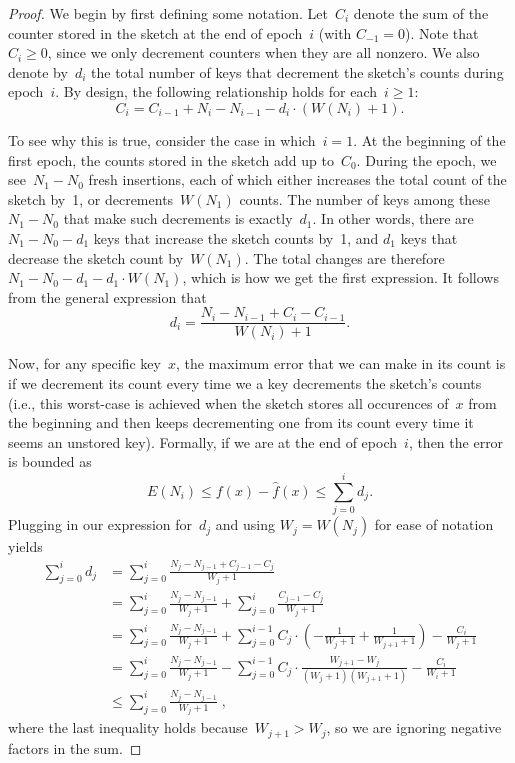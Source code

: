 \documentclass[sigconf]{acmart}
\newcommand{\parentheses}[1]{\left(#1\right)}
\begin{document}
\begin{proof}
    We begin by first defining some notation. Let~$C_i$ denote the sum of the
    counter stored in the sketch at the end of epoch~$i$ (with $C_{-1}=0$).
    Note that $C_i \geq 0$, since we only decrement counters when they are all
    nonzero. We also denote by~$d_i$ the total number of keys that decrement
    the sketch's counts during epoch~$i$. By design, the following relationship
    holds for each~$i\geq 1$:
    $$ C_i = C_{i-1} + N_i - N_{i-1} - d_i \cdot (W(N_i)+1). $$

    To see why this is true, consider the case in which~$i=1$. At the beginning
    of the first epoch, the counts stored in the sketch add up to~$C_0$. During
    the epoch, we see~$N_1-N_0$ fresh insertions, each of which either
    increases the total count of the sketch by~1, or decrements~$W(N_1)$
    counts. The number of keys among these~$N_1-N_0$ that make such decrements
    is exactly~$d_1$. In other words, there are~$N_1-N_0-d_1$ keys that
    increase the sketch counts by~1, and $d_1$ keys that decrease the sketch
    count by~$W(N_1)$. The total changes are therefore~$N_1-N_0-d_1 - d_1 \cdot
    W(N_1)$, which is how we get the first expression. It follows from the
    general expression that 
    $$ d_i = \frac{N_i - N_{i-1} + C_i - C_{i-1}}{W(N_i)+1}. $$

    Now, for any specific key~$x$, the maximum error that we can make in its
    count is if we decrement its count every time we a key decrements the
    sketch's counts (i.e., this worst-case is achieved when the sketch stores
    all occurences of~$x$ from the beginning and then keeps decrementing one
    from its count every time it seems an unstored key). Formally, if we are at
    the end of epoch~$i$, then the error is bounded as
    $$ E(N_i) \leq f(x) - \hat{f}(x) \leq \sum_{j=0}^i d_j.$$
    \noindent
    Plugging in our expression for~$d_j$ and using $W_j=W(N_j)$ for ease of
    notation yields 
    \begin{align*}
        \sum_{j=0}^i d_j & = \sum_{j=0}^i  \frac{N_j - N_{j-1} + C_{j-1}-C_j}{W_j+1} \\
        &= \sum_{j=0}^i \frac{N_j - N_{j-1}}{W_j+1} + \sum_{j=0}^i \frac{C_{j-1}-C_j}{W_j+1} \\
        &=\sum_{j=0}^i \frac{N_j - N_{j-1}}{W_j+1} + \sum_{j=0}^{i-1} C_j \cdot \parentheses{-\frac{1}{W_j+1}+\frac{1}{W_{j+1}+1}} - \frac{C_i}{W_j+1}\\
        &=\sum_{j=0}^i \frac{N_j - N_{j-1}}{W_j+1} - \sum_{j=0}^{i-1} C_j \cdot \frac{W_{j+1} - W_j}{(W_j+1)(W_{j+1}+1)} - \frac{C_i}{W_i+1}\\
        &\leq \sum_{j=0}^i  \frac{N_j - N_{j-1}}{W_j+1}  \;,
    \end{align*}
    where the last inequality holds because~$W_{j+1}>W_j$, so we are ignoring
    negative factors in the sum.
\end{proof}
\end{document}
